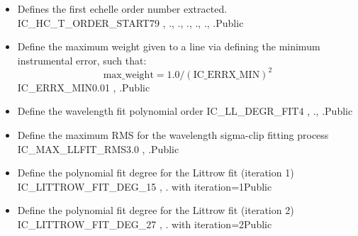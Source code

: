 \begin{itemize}
\item {} 
{Defines the first echelle order number extracted.}
{IC\_HC\_T\_ORDER\_START}{79}
{\calHC, \calWAVE}{\constantsfile}{\spirouTHORCA., \spirouTHORCA., \spirouTHORCA., \spirouTHORCA., \spirouTHORCA., \spirouTHORCA.}{Public}

\item {} 
{Define the maximum weight given to a line via defining the minimum instrumental error, such that:
\begin{equation}
\text{max\_weight} = 1.0 / (\text{IC\_ERRX\_MIN})^2
\end{equation}
}
{IC\_ERRX\_MIN}{0.01}
{\calHC, \calWAVE}{\constantsfile}{\spirouTHORCA.}{Public}

\item {} 
{Define the wavelength fit polynomial order}
{IC\_LL\_DEGR\_FIT}{4}
{\calHC, \calWAVE}{\constantsfile}{\spirouTHORCA., \spirouTHORCA.}{Public}

\item {} 
{Define the maximum RMS for the wavelength sigma-clip fitting process}
{IC\_MAX\_LLFIT\_RMS}{3.0}
{\calHC, \calWAVE}{\constantsfile}{\spirouTHORCA.}{Public}

\item {} 
{Define the polynomial fit degree for the Littrow fit (iteration 1)}
{IC\_LITTROW\_FIT\_DEG\_1}{5}
{\calHC, \calWAVE}{\constantsfile}{\spirouTHORCA. with iteration=1}{Public}

\item {} 
{Define the polynomial fit degree for the Littrow fit (iteration 2)}
{IC\_LITTROW\_FIT\_DEG\_2}{7}
{\calHC, \calWAVE}{\constantsfile}{\spirouTHORCA. with iteration=2}{Public}


\end{itemize}
